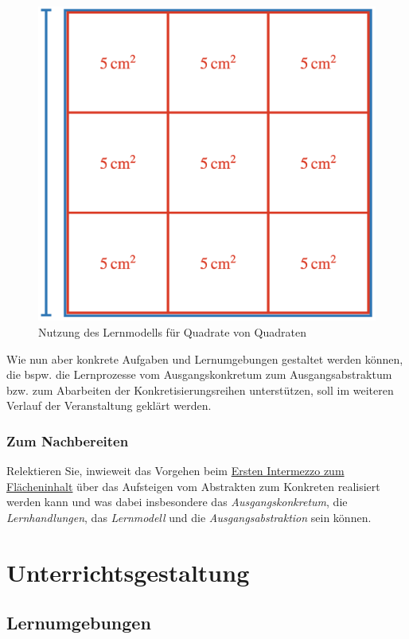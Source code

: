 \documentclass[
  ngerman,
]{scrbook}
\theoremstyle{definition}
\theoremstyle{definition}
\theoremstyle{definition}
\theoremstyle{definition}
\theoremstyle{remark}
\begin{document}
\begin{enumerate}
  \begin{figure}

    {\centering \includegraphics[width=0.5\linewidth]{pictures/8-QuadratQuadrat} 

    }

    \caption{Nutzung des Lernmodells für Quadrate von Quadraten}\label{fig:QuadratQuadrat}
    \end{figure}
\end{enumerate}

Wie nun aber konkrete Aufgaben und Lernumgebungen gestaltet werden können, die bspw. die Lernprozesse vom Ausgangskonkretum zum Ausgangsabstraktum bzw. zum Abarbeiten der Konkretisierungsreihen unterstützen, soll im weiteren Verlauf der Veranstaltung geklärt werden.

\hypertarget{zweites-intermezzo-nachbereitung}{%
\section{Zum Nachbereiten}\label{zweites-intermezzo-nachbereitung}}

Relektieren Sie, inwieweit das Vorgehen beim \protect\hyperlink{erstes-intermezzo-flaecheninhalt}{Ersten Intermezzo zum Flächeninhalt} über das Aufsteigen vom Abstrakten zum Konkreten realisiert werden kann und was dabei insbesondere das \emph{Ausgangskonkretum}, die \emph{Lernhandlungen}, das \emph{Lernmodell} und die \emph{Ausgangsabstraktion} sein können.

\hypertarget{part-unterrichtsgestaltung}{%
\part*{Unterrichtsgestaltung}\label{part-unterrichtsgestaltung}}

\hypertarget{lernumgebungen}{%
\chapter*{Lernumgebungen}\label{lernumgebungen}}
\end{document}
